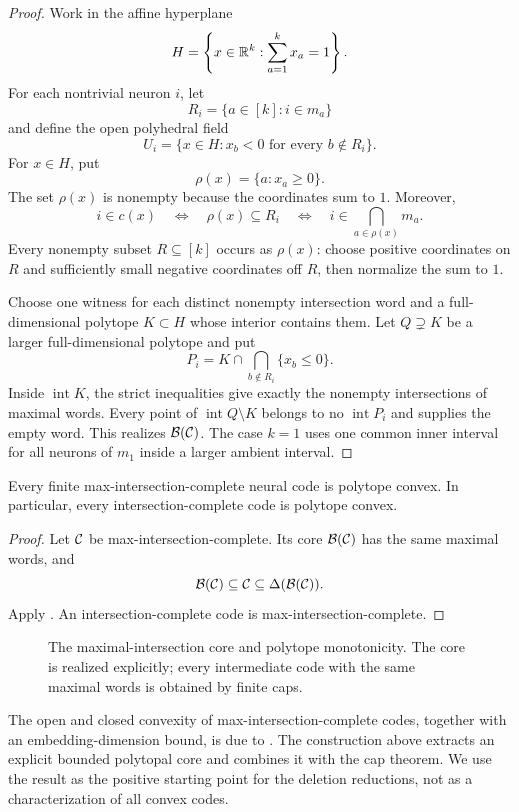 \begin{proof}
Work in the affine hyperplane
\[
 H=\left\{x\in\mathbb R^k:\sum_{a=1}^kx_a=1\right\}.
\]
For each nontrivial neuron $i$, let
\[
 R_i=\{a\in[k]:i\in m_a\}
\]
and define the open polyhedral field
\[
 U_i=\{x\in H:x_b<0\text{ for every }b\notin R_i\}.
\]
For $x\in H$, put
\[
 \rho(x)=\{a:x_a\ge0\}.
\]
The set $\rho(x)$ is nonempty because the coordinates sum to $1$.  Moreover,
\[
 i\in c(x)
 \quad\Longleftrightarrow\quad
 \rho(x)\subseteq R_i
 \quad\Longleftrightarrow\quad
 i\in\bigcap_{a\in\rho(x)}m_a.
\]
Every nonempty subset $R\subseteq[k]$ occurs as $\rho(x)$: choose positive coordinates on $R$ and sufficiently small negative coordinates off $R$, then normalize the sum to $1$.

Choose one witness for each distinct nonempty intersection word and a full-dimensional polytope $K\subset H$ whose interior contains them.  Let $Q\supsetneq K$ be a larger full-dimensional polytope and put
\[
 P_i=K\cap\bigcap_{b\notin R_i}\{x_b\le0\}.
\]
Inside $\operatorname{int}K$, the strict inequalities give exactly the nonempty intersections of maximal words.  Every point of $\operatorname{int}Q\setminus K$ belongs to no $\operatorname{int}P_i$ and supplies the empty word.  This realizes $\mathcal B(\mathcal C)$.  The case $k=1$ uses one common inner interval for all neurons of $m_1$ inside a larger ambient interval.
\end{proof}

\begin{theorem}
\label{thm:mic-polytopal}
Every finite max-intersection-complete neural code is polytope convex.  In particular, every intersection-complete code is polytope convex.
\end{theorem}

\begin{proof}
Let $\mathcal C$ be max-intersection-complete.  Its core $\mathcal B(\mathcal C)$ has the same maximal words, and
\[
 \mathcal B(\mathcal C)\subseteq\mathcal C\subseteq\Delta(\mathcal B(\mathcal C)).
\]
Apply .  An intersection-complete code is max-intersection-complete.
\end{proof}

\begin{figure}[t]
\centering

\caption{The maximal-intersection core and polytope monotonicity.  The core is realized explicitly; every intermediate code with the same maximal words is obtained by finite caps.}
\label{fig:inclusion-chain}
\end{figure}

\begin{remark}
The open and closed convexity of max-intersection-complete codes, together with an embedding-dimension bound, is due to \citet{CruzEtAl2019}.  The construction above extracts an explicit bounded polytopal core and combines it with the cap theorem.  We use the result as the positive starting point for the deletion reductions, not as a characterization of all convex codes.
\end{remark}
